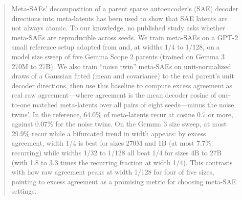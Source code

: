 \begin{abstract}
Meta-SAEs' decomposition of a parent sparse autoencoder's (SAE) decoder directions into meta-latents has been used to show that SAE latents are not always atomic.
To our knowledge, no published study asks whether meta-SAEs are reproducible across seeds.
We train meta-SAEs on a GPT-2 small reference setup adapted from \citet{leask2025canonical} and, at widths 1/4 to 1/128, on a model size sweep of five Gemma Scope 2 parents (trained on Gemma 3 270M to 27B).
We also train ``noise twin'' meta-SAEs on unit-normalized draws of a Gaussian fitted (mean and covariance) to the real parent's unit decoder directions, then use this baseline to compute excess agreement as real raw agreement---where agreement is the mean decoder cosine of one-to-one matched meta-latents over all pairs of eight seeds---minus the noise twins'.
In the reference, 64.0\% of meta-latents recur at cosine 0.7 or more, against 0.07\% for the noise twins.
On the Gemma 3 size sweep, at most 29.9\% recur while a bifurcated trend in width appears: by excess agreement, width 1/4 is best for sizes 270M and 1B (at most 7.7\% recurring) while widths 1/32 to 1/128 all beat 1/4 for sizes 4B to 27B (with 1.8 to 3.3 times the recurring fraction at width 1/4).
This contrasts with how raw agreement peaks at width 1/128 for four of five sizes, pointing to excess agreement as a promising metric for choosing meta-SAE settings.
\end{abstract}









\makeatletter
\if@accepted\fi
\makeatother




\appendix

